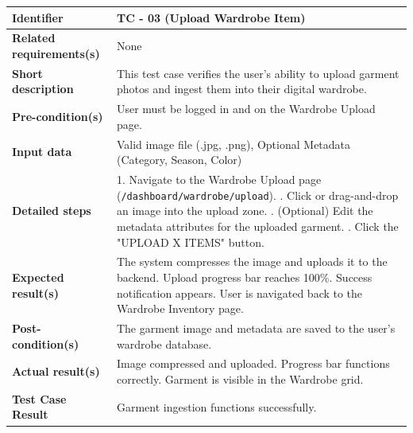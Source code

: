 \documentclass{article}
\begin{document}
\begin{table}[h!]
\centering
\renewcommand{\arraystretch}{1.5}
\begin{tabularx}{\textwidth}{|l|X|}
\hline
\textbf{Identifier} & TC - 03 (Upload Wardrobe Item) \\ \hline
\textbf{Related requirements(s)} & None \\ \hline
\textbf{Short description} & This test case verifies the user's ability to upload garment photos and ingest them into their digital wardrobe. \\ \hline
\textbf{Pre-condition(s)} & User must be logged in and on the Wardrobe Upload page. \\ \hline
\textbf{Input data} & Valid image file (.jpg, .png), Optional Metadata (Category, Season, Color) \\ \hline
\textbf{Detailed steps} & 
1. Navigate to the Wardrobe Upload page (\texttt{/dashboard/wardrobe/upload}). \newline
2. Click or drag-and-drop an image into the upload zone. \newline
3. (Optional) Edit the metadata attributes for the uploaded garment. \newline
4. Click the "UPLOAD X ITEMS" button. \\ \hline
\textbf{Expected result(s)} & 
The system compresses the image and uploads it to the backend. \newline
Upload progress bar reaches 100\%. \newline
Success notification appears. \newline
User is navigated back to the Wardrobe Inventory page. \\ \hline
\textbf{Post-condition(s)} & The garment image and metadata are saved to the user's wardrobe database. \\ \hline
\textbf{Actual result(s)} & 
Image compressed and uploaded. \newline
Progress bar functions correctly. \newline
Garment is visible in the Wardrobe grid. \\ \hline
\textbf{Test Case Result} & Garment ingestion functions successfully. \\ \hline
\end{tabularx}
\end{table}
\end{document}
